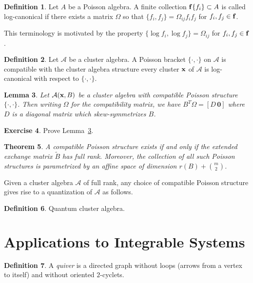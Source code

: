\documentclass{amsart}
\newtheorem{theorem}{Theorem}[section]
\newtheorem{lemma}[theorem]{Lemma}
\theoremstyle{definition}
\newtheorem{definition}[theorem]{Definition}
\newtheorem{exercise}[theorem]{Exercise}
\theoremstyle{remark}
\numberwithin{equation}{section}
\newcommand{\cA}{{\mathcal{A}}}
\newcommand{\bff}{{\bf f}}
\newcommand{\bx}{{\bf x}}
\begin{document}
  \begin{definition}
    Let $A$ be a Poisson algebra.  A finite collection $\bff\{f_i\}\subset A$ is called log-canonical if there exists a matrix $\Omega$ so that $\{f_i,f_j\}=\Omega_{ij}f_if_j$ for $f_i,f_j\in\bff$.
  \end{definition}
  This terminology is motivated by the property $\{\log f_i,\log f_j\}=\Omega_{ij}$ for $f_i,f_j\in\bff$.

  \begin{definition}
    Let $\cA$ be a cluster algebra.  A Poisson bracket $\{\cdot,\cdot\}$ on $\cA$ is compatible with the cluster algebra structure every cluster $\bx$ of $\cA$ is log-canonical with respect to $\{\cdot,\cdot\}$.
  \end{definition}

  \begin{lemma}
  \label{le:compatibility}
    Let $\cA(\bx,B)$ be a cluster algebra with compatible Poisson structure $\{\cdot,\cdot\}$.  Then writing $\Omega$ for the compatibility matrix, we have $B^T\Omega=[D\, \boldsymbol{0}]$ where $D$ is a diagonal matrix which skew-symmetrizes $B$.
  \end{lemma}
  \begin{exercise}
    Prove Lemma~\ref{le:compatibility}. 
  \end{exercise}

  \begin{theorem}
    A compatible Poisson structure exists if and only if the extended exchange matrix $\tilde B$ has full rank.  Moreover, the collection of all such Poisson structures is parametrized by an affine space of dimension $r(B)+{m\choose 2}$.
  \end{theorem}

  Given a cluster algebra $\cA$ of full rank, any choice of compatible Poisson structure gives rise to a quantization of $\cA$ as follows.

  \begin{definition}
    Quantum cluster algebra.
  \end{definition}

\section{Applications to Integrable Systems}\label{sec:integrable_systems}
	\begin{definition}
		A \emph{quiver} is a directed graph without loops (arrows from a vertex to itself) and without oriented $2$-cyclets.
	\end{definition}
	
\end{document}
